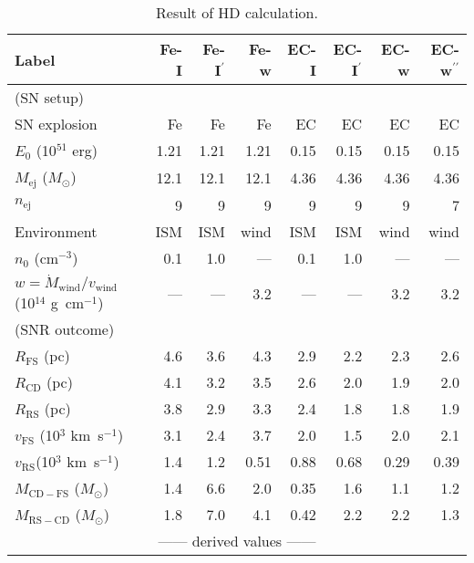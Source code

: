\documentclass[]{pasj01}
\begin{document}
\begin{table*}[ht]
  \caption{Result of HD calculation.}
  \label{t03}
 \begin{center}
  \begin{tabular}{lrrrrrrr}
   \hline
   Label                                    & Fe-I & Fe-I$^{\prime}$ & Fe-w & EC-I & EC-I$^{\prime}$ & EC-w & EC-w$^{\prime\prime}$ \\
   \hline
   \multicolumn{8}{l}{(SN setup)}\\
   SN explosion                             & Fe   & Fe   & Fe   & EC   & EC   & EC   & EC \\
   $E_{0}$ (10$^{51}$ erg)                  & 1.21 & 1.21 & 1.21 & 0.15 & 0.15 & 0.15 & 0.15 \\
   $M_{\mathrm{ej}}$ ($M_{\mathrm{\odot}}$) & 12.1 & 12.1 & 12.1 & 4.36 & 4.36 & 4.36 & 4.36 \\
   $n_{\mathrm{ej}}$                        & 9    & 9    & 9    & 9    & 9    & 9    & 7 \\
   Environment                              & ISM  & ISM  & wind & ISM  & ISM  & wind & wind \\
   $n_0$ (cm$^{-3}$)                        & 0.1  & 1.0  & ---  & 0.1  & 1.0  & ---  & --- \\
   $w=\dot{M}_{\mathrm{wind}}/v_{\mathrm{wind}}$ (10$^{14}$ g~cm$^{-1}$)   & ---  & ---  & 3.2 & ---  & ---  & 3.2 & 3.2 \\
   \hline
   \multicolumn{8}{l}{(SNR outcome)}\\
   $R_{\mathrm{FS}}$ (pc)                               & 4.6  & 3.6 & 4.3  & 2.9  & 2.2 & 2.3 & 2.6 \\
   $R_{\mathrm{CD}}$ (pc)                               & 4.1  & 3.2 & 3.5  & 2.6  & 2.0 & 1.9 & 2.0 \\
   $R_{\mathrm{RS}}$ (pc)                               & 3.8  & 2.9 & 3.3  & 2.4  & 1.8 & 1.8 & 1.9 \\
   $v_{\mathrm{FS}}$ (10$^{3}$ km~s$^{-1}$)             & 3.1  & 2.4 & 3.7  & 2.0  & 1.5 & 2.0 & 2.1 \\
   $v_{\mathrm{RS}}$\footnotemark[$*$] (10$^{3}$ km~s$^{-1}$)  & 1.4 & 1.2  & 0.51 & 0.88& 0.68 & 0.29 & 0.39 \\
   $M_{\mathrm{CD-FS}}$ ($M_{\odot}$)                   & 1.4  & 6.6 & 2.0  & 0.35 & 1.6 & 1.1 & 1.2 \\
   $M_{\mathrm{RS-CD}}$ ($M_{\odot}$)                   & 1.8  & 7.0 & 4.1  & 0.42 & 2.2 & 2.2 & 1.3 \\
   \multicolumn{8}{c}{------ derived values ------}\\

\end{tabular}
\end{center}
\end{table*}
\end{document}
